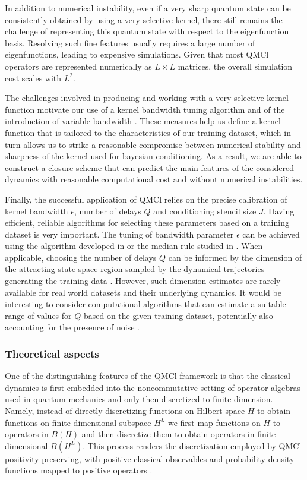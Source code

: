 \documentclass[letterpaper,10pt,3p,preprint]{elsarticle}
\begin{document}
In addition to numerical instability, even if a very sharp quantum
state can be consistently obtained by using a very selective kernel,
there still remains the challenge of representing this quantum state
with respect to the eigenfunction basis.
Resolving such fine features usually requires a large number of
eigenfunctions, leading to expensive simulations.
Given that most QMCl operators are represented numerically as
$L\times L$ matrices, the overall simulation cost scales with
$L^2$.

The challenges involved in producing and working with a very
selective kernel function motivate our use of a kernel
bandwidth tuning algorithm \cite{Coifman2008}
and of the introduction of variable bandwidth
\cite{Berry2016,Giannakis2019acha}.
These measures help us define a kernel function that is
tailored to the characteristics of our training dataset,
which in turn allows us to strike a reasonable
compromise between numerical stability and sharpness
of the kernel used for bayesian conditioning.
As a result, we are able to construct a closure scheme
that can predict the main features of the considered
dynamics with reasonable computational cost and without
numerical instabilities.

Finally, the successful application of QMCl relies on the
precise calibration of kernel bandwidth $\epsilon$,
number of delays $Q$ and conditioning stencil size $J$.
Having efficient, reliable algorithms for selecting these
parameters based on a training dataset is very important.
The tuning of bandwidth parameter $\epsilon$ can be achieved
using the algorithm developed in \cite{Coifman2008}
or the median rule studied in \cite{Garreau2018}.
When applicable, choosing the number of delays $Q$
can be informed by the dimension of the attracting state space
region sampled by the dynamical trajectories generating the
training data \cite{Sauer1991}.
However, such dimension estimates are rarely available for
real world datasets and their underlying dynamics.
It would be interesting to consider computational algorithms
that can estimate a suitable range of values for $Q$ based
on the given training dataset, potentially also accounting
for the presence of noise
\cite{Zbilut1992,Marwan2007,Botvinick2024}.

\subsubsection*{Theoretical aspects}
One of the distinguishing features of the QMCl framework is that
the classical dynamics is first embedded into the noncommutative
setting of operator algebras used in quantum mechanics
and only then discretized to finite dimension.
Namely, instead of directly discretizing functions on
Hilbert space $H$ to obtain functions on finite dimensional
subspace $H^L$
we first map functions on $H$ to operators in $B(H)$
and then discretize them to obtain operators in finite
dimensional $B(H^L)$.
This process renders the discretization employed by QMCl
positivity preserving, with positive classical observables
and probability density functions mapped to positive
operators \cite{Freeman2024}.
\end{document}

